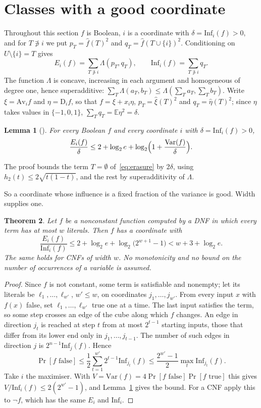 \documentclass[11pt]{amsart}
\newtheorem{theorem}{Theorem}[section]
\newtheorem{lemma}[theorem]{Lemma}
\theoremstyle{definition}
\theoremstyle{remark}
\newcommand{\Inf}{\mathrm{Inf}}
\newcommand{\E}{\mathbb{E}}
\begin{document}
\section{Classes with a good coordinate}\label{sec:classes}

Throughout this section $f$ is Boolean, $i$ is a coordinate with $\delta=\Inf_i(f)>0$, and for $T\not\ni i$ we put
$p_T=\hat f(T)^2$ and $q_T=\hat f(T\cup\{i\})^2$. Conditioning on $U\setminus\{i\}=T$ gives
\begin{equation}\label{eq:erasure}
E_i(f)=\sum_{T\not\ni i}\Lambda(p_T,q_T),\qquad \Inf_i(f)=\sum_{T\not\ni i}q_T .
\end{equation}
The function $\Lambda$ is concave, increasing in each argument and homogeneous of degree one, hence superadditive:
$\sum_T \Lambda(a_T,b_T)\le \Lambda(\sum_Ta_T,\sum_Tb_T)$. Write $\xi=\mathrm{Av}_if$ and $\eta=\mathrm D_if$, so that $f=\xi+x_i\eta$,
$p_T=\hat \xi(T)^2$ and $q_T=\hat \eta(T)^2$; since $\eta$ takes values in $\{-1,0,1\}$, $\sum_Tq_T=\E \eta^2=\delta$.

\begin{lemma}[{\cite[Lemma~5]{ShmVar}}]\label{lem:var}
For every Boolean $f$ and every coordinate $i$ with $\delta=\Inf_i(f)>0$,
\[
\frac{E_i(f)}{\delta}\le 2+\log_2e+\log_2\Bigl(1+\frac{\mathrm{Var}(f)}{\delta}\Bigr).
\]
\end{lemma}

The proof bounds the term $T=\emptyset$ of~\eqref{eq:erasure} by $2\delta$, using $h_2(t)\le2\sqrt{t(1-t)}$, and the
rest by superadditivity of $\Lambda$.

So a coordinate whose influence is a fixed fraction of the variance is good. Width supplies one.

\begin{theorem}\label{thm:width}
Let $f$ be a nonconstant function computed by a DNF in which every term has at most $w$ literals. Then $f$ has a
coordinate with
\[
\frac{E_i(f)}{\Inf_i(f)}\le 2+\log_2e+\log_2\bigl(2^{w+1}-1\bigr)<w+3+\log_2e .
\]
The same holds for CNFs of width $w$. No monotonicity and no bound on the number of occurrences of a variable is
assumed.
\end{theorem}

\begin{proof}
Since $f$ is not constant, some term is satisfiable and nonempty; let its literals be $\ell_1,\dots,\ell_{w'}$, $w'\le w$,
on coordinates $j_1,\dots,j_{w'}$. From every input $x$ with $f(x)$ false, set $\ell_1,\dots,\ell_{w'}$ true one at a time.
The last input satisfies the term, so some step crosses an edge of the cube along which $f$ changes. An edge in
direction $j_t$ is reached at step $t$ from at most $2^{t-1}$ starting inputs, those that differ from its lower end
only in $j_1,\dots,j_{t-1}$. The number of such edges in direction $j$ is $2^{n-1}\Inf_j(f)$. Hence
\[
\Pr[f\text{ false}]\le\frac12\sum_{t=1}^{w'}2^{t-1}\Inf_{j_t}(f)\le\frac{2^{w'}-1}{2}\max_t\Inf_{j_t}(f).
\]
Take $i$ the maximiser. With $V=\mathrm{Var}(f)=4\Pr[f\text{ false}]\Pr[f\text{ true}]$ this gives
$V/\Inf_i(f)\le2(2^{w'}-1)$, and Lemma~\ref{lem:var} gives the bound. For a CNF apply this to $\neg f$, which has the
same $E_i$ and $\Inf_i$.
\end{proof}
\end{document}
